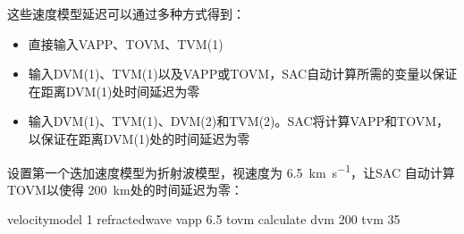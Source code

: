 这些速度模型延迟可以通过多种方式得到：
\begin{itemize}
\item 直接输入VAPP、TOVM、TVM(1)
\item 输入DVM(1)、TVM(1)以及VAPP或TOVM，SAC自动计算所需的变量以保证在距离DVM(1)处时间延迟为零
\item 输入DVM(1)、TVM(1)、DVM(2)和TVM(2)。SAC将计算VAPP和TOVM，以保证在距离DVM(1)处的时间延迟为零
\end{itemize}

设置第一个迭加速度模型为折射波模型，视速度为 \SI{6.5}{\km\per\s}，让SAC
自动计算TOVM以使得 \SI{200}{\km}处的时间延迟为零：
\begin{SACCode}
velocitymodel 1 refractedwave vapp 6.5 tovm calculate dvm 200 tvm 35
\end{SACCode}
